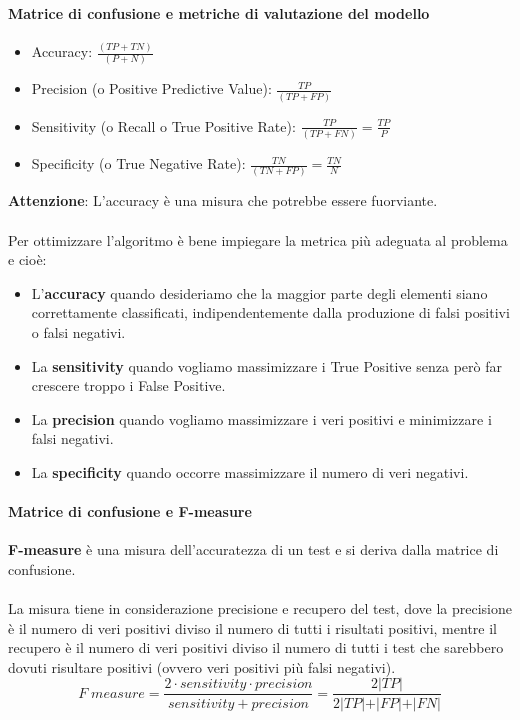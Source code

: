 \documentclass[../main.tex]{subfiles}
\begin{document}
	\paragraph{Matrice di confusione e metriche di valutazione del modello}
	\begin{itemize}
		\item Accuracy: $\frac{(TP + TN)}{(P + N)}$
		\item Precision (o Positive Predictive Value): $\frac{TP}{(TP + FP)}$
		\item Sensitivity (o Recall o True Positive Rate): $\frac{TP}{(TP + FN)} = \frac{TP}{P}$
		\item Specificity (o True Negative Rate): $\frac{TN}{(TN + FP)} = \frac{TN}{N}$
	\end{itemize}
	\textbf{Attenzione}: L’accuracy è una misura che potrebbe essere fuorviante.\\\\
	Per ottimizzare l’algoritmo è bene impiegare la metrica più adeguata al problema e cioè:
	\begin{itemize}
		\item L’\textbf{accuracy} quando desideriamo che la maggior parte degli elementi siano correttamente classificati, indipendentemente dalla produzione di falsi positivi o falsi negativi.
		\item La \textbf{sensitivity} quando vogliamo massimizzare i True Positive senza però far crescere troppo i False Positive.
		\item La \textbf{precision} quando vogliamo massimizzare i veri positivi e minimizzare i falsi negativi.
		\item La \textbf{specificity} quando occorre massimizzare il numero di veri negativi.
	\end{itemize}
	\paragraph{Matrice di confusione e F-measure}
	\textbf{F-measure} è una misura dell’accuratezza di un test e si deriva dalla matrice di confusione.\\\\
	La misura tiene in considerazione precisione e recupero del test, dove la precisione è il numero di veri positivi diviso il numero di tutti i risultati positivi, mentre il recupero è il numero di veri positivi diviso il numero di tutti i test che sarebbero dovuti risultare positivi (ovvero veri positivi più falsi negativi).
	\[F \; measure = \frac{2 \cdot sensitivity \cdot precision}{sensitivity + precision} = \frac{2 \vert TP \vert}{2 \vert TP \vert + \vert FP \vert + \vert FN \vert}\]
\end{document}
